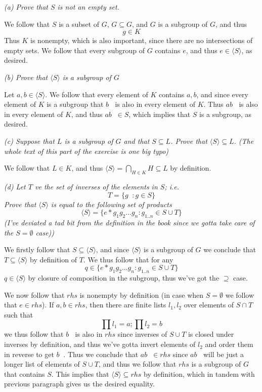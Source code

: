 \documentclass[11pt,oneside,titlepage]{book}
\DeclareMathOperator \inv {^{-1}}
\newcommand{\eangle}[1]{\langle #1 \rangle}
\newcommand{\set}[1]{\{ #1 \}}
\begin{document}
\textit{(a) Prove that $S$ is not an empty set.}

We follow that $S$ is a subset of $G$, $G \subseteq G$, and $G$ is a
subgroup of $G$, and thus
$$g \in K$$
Thus $K$ is nonempty, which is also important, since there are no
intersections of empty sets.  We follow that every subgroup of $G$
contains $e$, and thus $e \in \eangle{S}$, as desired.

\textit{(b) Prove that $\eangle{S}$ is a subgroup of $G$}

Let $a, b \in \eangle{S}$. We follow that every element of $K$ contains $a, b$, and
since every element of $K$ is a subgroup that $b\inv$ is also in every element of $K$.
Thus $a b\inv$ is also in every element of $K$, and thus $a b\inv \in S$, which implies that
$S$ is a subgroup, as desired.

\textit{(c) Suppose that $L$ is a subgroup of $G$ and that $S \subseteq L$. Prove that
  $\eangle{S} \subseteq L$. (The whole text of this part of the
  exercise is one big typo)
}

We follow that $L \in K$, and thus $\eangle{S} = \bigcap_{H \in K}{H}
\subseteq L$ by definition.

\textit{(d) Let $T$ ve the set of inverses of the elements in $S$; i.e.
  $$T = \set{g\inv: g \in S}$$
  Prove that $\eangle{S}$ is equal to the following set of products
  $$\eangle{S} = \set{e * g_1 g_2 ... g_n: g_{1..n} \in S \cup T}$$
  (I've deviated a tad bit from the definition in the book since we gotta
  take care of the $S = \emptyset$ case))
}

We firstly follow that $S \subseteq \eangle{S}$, and since
$\eangle{S}$ is a subgroup of $G$ we conclude that $T \subseteq
\eangle{S}$ by definition of $T$. We thus follow that for any
$$q \in \set{e * g_1 g_2 ... g_n: g_{1..n} \in S \cup T}$$
$q \in \eangle{S}$ by closure of composition in the subgroup, thus
we've got the $\supseteq$ case.

We now follow that $rhs$ is nonempty by definition (in case when $S =
\emptyset$ we follow that $e \in rhs$). If $a, b \in rhs$, then
there are finite lists $l_1, l_2$ over elements of $S \cap T$ such that
$$\prod{l_1} = a; \prod{l_2} = b$$
we thus follow that $b\inv$ is also in $rhs$ since inverses of $S \cup
T$ is closed under inverses by definition, and thus we've gotta invert
elements of $l_2$ and order them in reverse to get $b\inv$. Thus we conclude
that $a b\inv \in rhs$ since $a b\inv$ will be just a longer list of
elements of $S \cup T$, and thus we follow that $rhs$ is a subgroup of $G$ that
contains $S$. This implies that $\eangle{S} \subseteq rhs$ by definition, which
in tandem with previous paragraph gives us the desired equality.
\end{document}
